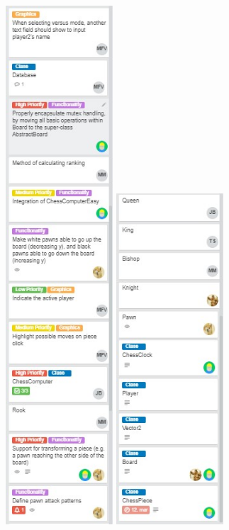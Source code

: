 \documentclass{article}
\begin{document}
\includegraphics[width=4cm]{20180510-programmingdone2.jpg}
\includegraphics[width=4cm]{20180510-programmingdone3.jpg} \\
\end{document}
